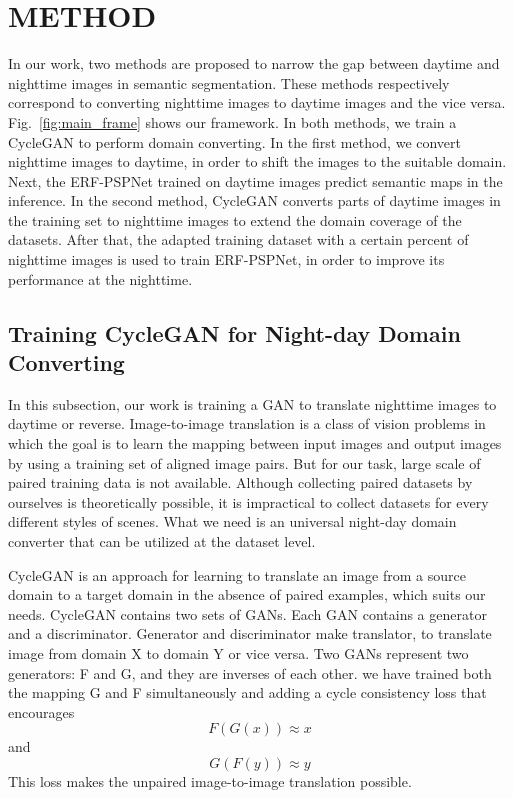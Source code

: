 \documentclass[a4paper]{spie}
\begin{document}
\section{METHOD}
\label{sec:sections}

In our work, two methods are proposed to narrow the gap between daytime and nighttime images in semantic segmentation. These methods respectively correspond to converting nighttime images to daytime images and the vice versa. Fig.~\ref{fig:main_frame} shows our framework. In both methods, we train a CycleGAN to perform domain converting. In the first method, we convert nighttime images to daytime, in order to shift the images to the suitable domain. Next, the ERF-PSPNet\cite{yang2018unifying,yang2019can} trained on daytime images predict semantic maps in the inference. In the second method, CycleGAN converts parts of daytime images in the training set to nighttime images to extend the domain coverage of the datasets. After that, the adapted training dataset with a certain percent of nighttime images is used to train ERF-PSPNet, in order to improve its performance at the nighttime.
 
\subsection{Training CycleGAN for Night-day Domain Converting}

In this subsection, our work is training a GAN to translate nighttime images to daytime or reverse. Image-to-image translation is a class of vision problems in which the goal is to learn the mapping between input images and output images by using a training set of aligned image pairs. But for our task, large scale of paired training data is not available. Although collecting paired datasets by ourselves is theoretically possible, it is impractical to collect datasets for every different styles of scenes. What we need is an universal night-day domain converter that can be utilized at the dataset level.

CycleGAN\cite{zhu2017unpaired} is an approach for learning to translate an image from a source domain to a target domain in the absence of paired examples, which suits our needs. CycleGAN contains two sets of GANs. Each GAN contains a generator and a discriminator. Generator and discriminator make translator, to translate image from domain X to domain Y or vice versa. Two GANs represent two generators: F and G, and they are inverses of each other. we have trained both the mapping G and F simultaneously and adding a cycle consistency loss that encourages \begin{equation}F(G(x))\approx x\end{equation} and \begin{equation}G(F(y))\approx y\end{equation}
This loss makes the unpaired image-to-image translation possible. 
\end{document}
